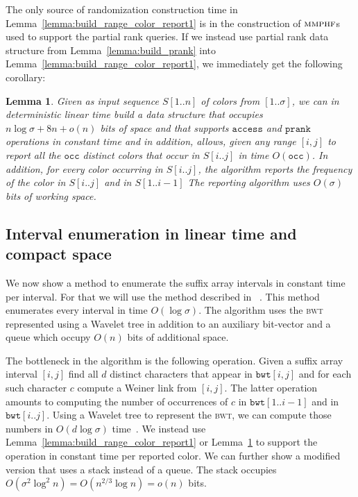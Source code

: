 \documentclass[a4paper]{article}
\newtheorem{lemma}{Lemma}
\begin{document}
The only source of randomization construction time in Lemma~\ref{lemma:build_range_color_report1}
is in the construction of $\textsc{mmphf}$s used to support the partial rank 
queries. If we instead use partial rank data structure from Lemma~\ref{lemma:build_prank} 
into Lemma~\ref{lemma:build_range_color_report1}, we immediately get the following 
corollary: 
\begin{lemma}
\label{lemma:build_range_color_report2}
Given as input sequence $S[1..n]$ of colors from $[1..\sigma]$, 
we can in deterministic linear time 
build a data structure that occupies $n\log\sigma+8n+o(n)$
bits of space and that supports $\mathtt{access}$ and 
$\mathtt{prank}$ operations in constant time
and in addition, allows, given any range $[i,j]$ to 
report all the $\mathtt{occ}$ distinct
colors that occur in $S[i..j]$ in time $O(\mathtt{occ})$. 
In addition, for every color occurring in $S[i..j]$, the algorithm reports 
the frequency of the color in $S[i..j]$ and in $S[1..i-1]$
The reporting algorithm uses $O(\sigma)$ bits of working space. 
\end{lemma}





\subsection{Interval enumeration in linear time and compact space}
\label{subsec:linear_time_bwt_interval_enum}
We now show a method to enumerate the suffix array intervals in constant 
time per interval. For that we will use the method described in
~\cite{BBO12,BGOS13}. This method enumerates every interval in time 
$O(\log\sigma)$. The algorithm uses the \textsc{bwt} represented 
using a Wavelet tree in addition to an auxiliary bit-vector and a queue 
which occupy $O(n)$ bits of additional space. 

The bottleneck in the algorithm is the following operation. Given a
suffix array interval $[i,j]$ find all $d$ distinct characters that appear in $\mathtt{bwt}[i,j]$
and for each such character $c$ compute a Weiner link from $[i,j]$. 
The latter operation amounts to computing the number of occurrences of $c$ in $\mathtt{bwt}[1..i-1]$ 
and in $\mathtt{bwt}[i..j]$. Using a Wavelet tree to represent the \textsc{bwt}, we can compute 
those numbers in $O(d\log\sigma)$ time~\cite{BGOS13}. 
We instead use Lemma~\ref{lemma:build_range_color_report1} 
or Lemma~\ref{lemma:build_range_color_report2} to support the operation in constant time
per reported color. 
We can further show a modified version that uses a stack instead of a queue. 
The stack occupies $O(\sigma^2\log^2n)=O(n^{2/3}\log n)=o(n)$ bits. 
\end{document}
